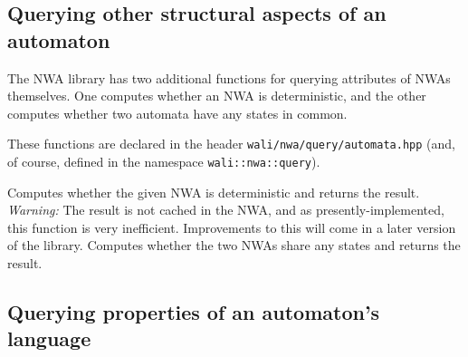




\subsection{Querying other structural aspects of an automaton}
\label{Se:query-automaton}

The NWA library has two additional functions for querying attributes
of NWAs themselves. One computes whether an NWA is deterministic, and
the other computes whether two automata have any states in common.

These functions are declared in the header
\texttt{wali/nwa/query/automata.hpp} (and, of course, defined in the
namespace \texttt{wali::nwa::query}).

\begin{functionlist}
    Computes whether the given NWA is deterministic and returns the
    result. \textit{Warning:} The result is not cached in the NWA, and
    as presently-implemented, this function is very
    inefficient. Improvements to this will come in a later version of
    the library.
    Computes whether the two NWAs share any states and returns the
    result.
\end{functionlist}


\subsection{Querying properties of an automaton's language}
\label{Se:query-language}

